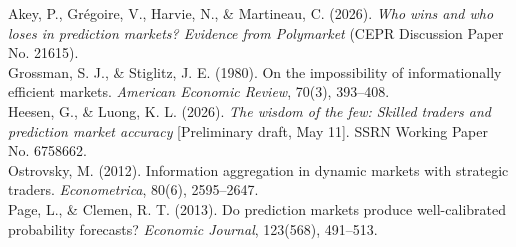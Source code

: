 \begin{frame}[t]
\par{}
\begin{pmbody}
\begin{pmcallout}[]
{\fontsize{18}{26}\selectfont
Akey, P., Grégoire, V., Harvie, N., \& Martineau, C. (2026). \textit{Who wins and who loses in prediction markets? Evidence from Polymarket} (CEPR Discussion Paper No. 21615). \\[4pt]
Grossman, S. J., \& Stiglitz, J. E. (1980). On the impossibility of informationally efficient markets. \textit{American Economic Review}, 70(3), 393--408. \\[4pt]
Heesen, G., \& Luong, K. L. (2026). \textit{The wisdom of the few: Skilled traders and prediction market accuracy} [Preliminary draft, May 11]. SSRN Working Paper No. 6758662. \\[4pt]
Ostrovsky, M. (2012). Information aggregation in dynamic markets with strategic traders. \textit{Econometrica}, 80(6), 2595--2647. \\[4pt]
Page, L., \& Clemen, R. T. (2013). Do prediction markets produce well-calibrated probability forecasts? \textit{Economic Journal}, 123(568), 491--513.
\par}
\end{pmcallout}
\end{pmbody}
\end{frame}

